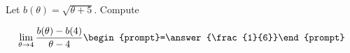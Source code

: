 \documentclass{ximera}
\author{Bart Snapp}
\begin{document}
\begin{exercise}
Let $b(\theta) = \sqrt{\theta +5}$. Compute

\[
\lim_{ \theta\to 4 } 
\frac{b(\theta)-b(4)}{\theta -4} \begin{prompt}=\answer{\frac{1}{6}}\end{prompt}
\]
\end{exercise}
\end{document}
